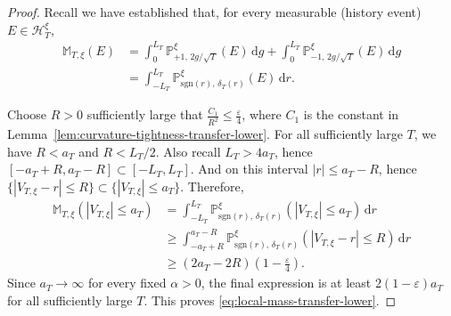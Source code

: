 \documentclass[10pt]{article}
\newcommand{\dd}{\mathrm{d}}
\theoremstyle{plain}
\begin{document}
\begin{proof}
Recall we have established that, for every measurable (history event) $E \in \mathscr H^\xi_T$,
\begin{equation}
\label{eq:M-signed-mixture-transfer-lower}
\begin{aligned}
    \mathbb M_{T,\xi}(E)
    &=
    \int_0^{L_T}
        \mathbb P_{+1,\,2g/\sqrt T}^{\xi}(E)
    \,\dd g
    +
    \int_0^{L_T}
        \mathbb P_{-1,\,2g/\sqrt T}^{\xi}(E)
    \,\dd g\\
    &=
    \int_{-L_T}^{L_T}
        \mathbb P_{\mathrm{sgn}(r),\,\delta_T(r)}^\xi(E)
    \,\dd r.
\end{aligned}
\end{equation}

Choose $R>0$ sufficiently large that
    $\frac{C_1}{R^2}
    \le
    \frac{\varepsilon}{4}$,
where $C_1$ is the constant in
Lemma~\ref{lem:curvature-tightness-transfer-lower}. For all sufficiently
large $T$, we have $R<a_T$ and $R<L_T/2$. Also recall $L_T>4a_T$, hence $[-a_T+R,a_T-R] \subset [-L_T,L_T]$. And on this interval $|r|\le a_T-R$, hence $\{ |V_{T,\xi}-r|\le R \} \subset \{ |V_{T,\xi}|\le a_T \}$. Therefore,
\[
\begin{aligned}
    \mathbb M_{T,\xi}
    \left(
        |V_{T,\xi}|\le a_T
    \right)
    &=
    \int_{-L_T}^{L_T}
        \mathbb P_{\mathrm{sgn}(r),\,\delta_T(r)}^\xi
        \left(
            |V_{T,\xi}|\le a_T
        \right)
    \,\dd r\\
    &\ge
    \int_{-a_T+R}^{a_T-R}
        \mathbb P_{\mathrm{sgn}(r),\,\delta_T(r)}^\xi
        \left(
            |V_{T,\xi}-r|\le R
        \right)
    \,\dd r\\
    &\ge
    (2a_T-2R)
    \left(
        1-\frac{\varepsilon}{4}
    \right).
\end{aligned}
\]
Since $a_T\to\infty$ for every fixed $\alpha>0$, the final expression is
at least $2(1-\varepsilon)a_T$ for all sufficiently large $T$. This proves
\eqref{eq:local-mass-transfer-lower}.



\end{proof}
\end{document}
